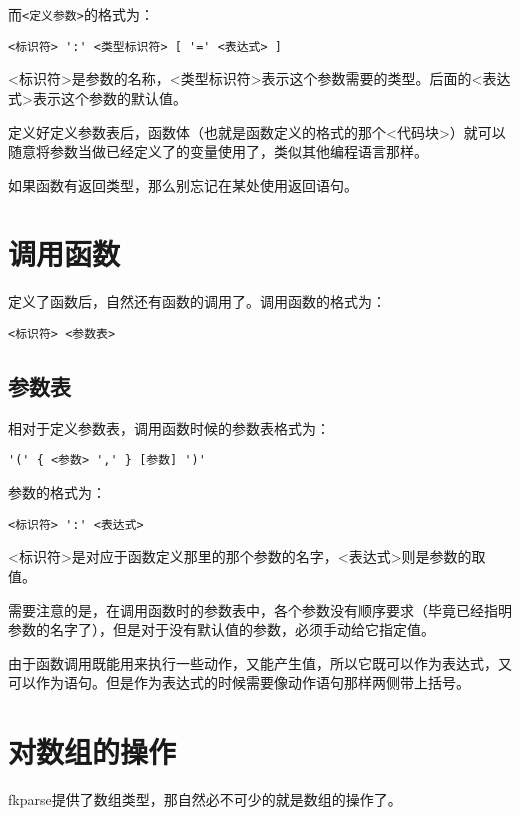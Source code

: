 而\verb|<定义参数>|的格式为：

\begin{verbatim}
<标识符> ':' <类型标识符> [ '=' <表达式> ]
\end{verbatim}

<标识符>是参数的名称，<类型标识符>表示这个参数需要的类型。后面的<表达式>表示这个参数的默认值。

定义好定义参数表后，函数体（也就是函数定义的格式的那个<代码块>）就可以随意将参数当做已经定义了的变量使用了，类似其他编程语言那样。

如果函数有返回类型，那么别忘记在某处使用返回语句。

\section{调用函数}

定义了函数后，自然还有函数的调用了。调用函数的格式为：

\begin{verbatim}
<标识符> <参数表>
\end{verbatim}

\subsection{参数表}

相对于定义参数表，调用函数时候的参数表格式为：

\begin{verbatim}
'(' { <参数> ',' } [参数] ')'
\end{verbatim}

参数的格式为：

\begin{verbatim}
<标识符> ':' <表达式>
\end{verbatim}

<标识符>是对应于函数定义那里的那个参数的名字，<表达式>则是参数的取值。

需要注意的是，在调用函数时的参数表中，各个参数没有顺序要求（毕竟已经指明参数的名字了），但是对于没有默认值的参数，必须手动给它指定值。

由于函数调用既能用来执行一些动作，又能产生值，所以它既可以作为表达式，又可以作为语句。但是作为表达式的时候需要像动作语句那样两侧带上括号。

\section{对数组的操作}

fkparse提供了数组类型，那自然必不可少的就是数组的操作了。

